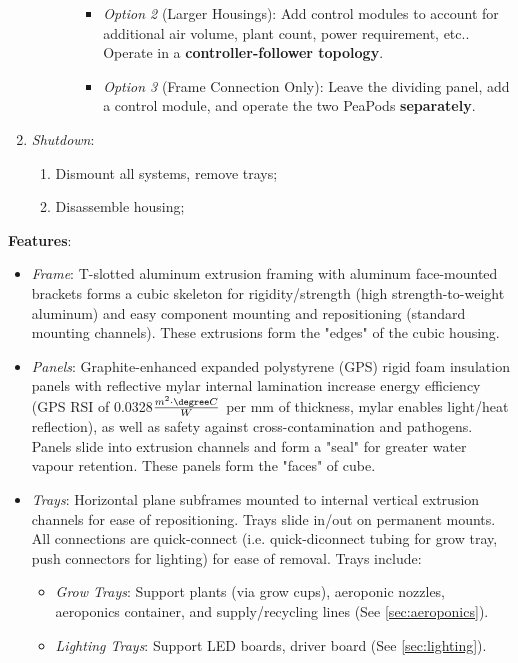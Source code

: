 \documentclass{report}
\begin{document}
\begin{enumerate}
\begin{enumerate}
\begin{enumerate}
\begin{itemize}
                \item \textit{Option 2} (Larger Housings): Add control modules to account for additional air volume, plant count, power requirement, etc.. Operate in a \textbf{controller-follower topology}.
                \item \textit{Option 3} (Frame Connection Only): Leave the dividing panel, add a control module, and operate the two PeaPods \textbf{separately}.
            \end{itemize}
        \end{enumerate}
    \end{enumerate}
    \item \textit{Shutdown}:
    \begin{enumerate}
        \item Dismount all systems, remove trays;
        \item Disassemble housing;
    \end{enumerate}
\end{enumerate}

\newpage

\textbf{Features}:
\begin{itemize}
    \item \textit{Frame}: T-slotted aluminum extrusion framing with aluminum face-mounted brackets forms a cubic skeleton for rigidity/strength (high strength-to-weight aluminum) and easy component mounting and repositioning (standard mounting channels). These extrusions form the "edges" of the cubic housing. %
    \item \textit{Panels}: Graphite-enhanced expanded polystyrene (GPS) rigid foam insulation panels \cite{insulation} with reflective mylar internal lamination increase energy efficiency (GPS RSI of 0.0328$\frac{m^2 \cdot \degree C}{W}$ per mm of thickness, mylar enables light/heat reflection), as well as safety against cross-contamination and pathogens. Panels slide into extrusion channels and form a "seal" for greater water vapour retention. These panels form the "faces" of cube. %
    \item \textit{Trays}: Horizontal plane subframes mounted to internal vertical extrusion channels for ease of repositioning. Trays slide in/out on permanent mounts. All connections are quick-connect (i.e. quick-diconnect tubing for grow tray, push connectors for lighting) for ease of removal. Trays include:
    \begin{itemize}
        \item \textit{Grow Trays}: Support plants (via grow cups), aeroponic nozzles, aeroponics container, and supply/recycling lines (See \ref{sec:aeroponics}).
        \item \textit{Lighting Trays}: Support LED boards, driver board (See \ref{sec:lighting}).
    \end{itemize}
\end{itemize}
\end{document}
